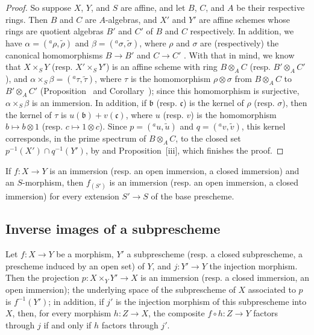 \begin{proof}
So suppose $X$, $Y$, and $S$ are affine, and let $B$, $C$, and $A$ be their respective rings.
Then $B$ and $C$ are $A$-algebras, and $X'$ and $Y'$ are affine schemes whose rings are quotient algebras $B'$ and $C'$ of $B$ and $C$ respectively.
In addition, we have $\alpha=({}^a\rho,\widetilde{\rho})$ and $\beta=({}^a\sigma,\widetilde{\sigma})$, where $\rho$ and $\sigma$ are (respectively) the canonical homomorphisms $B\to B'$ and $C\to C'$ .
With that in mind, we know that $X\times_S Y$ (resp. $X'\times_S Y'$) is an affine scheme with ring $B\otimes_A C$ (resp. $B'\otimes_A C'$), and $\alpha\times_S\beta=({}^a\tau,\widetilde{\tau})$, where $\tau$ is the homomorphism $\rho\otimes\sigma$ from $B\otimes_A C$ to $B'\otimes_A C'$ (Proposition~ and Corollary~);
since this homomorphism is surjective, $\alpha\times_S\beta$ is an immersion.
In addition, if $\mathfrak{b}$ (resp. $\mathfrak{c}$) is the kernel of $\rho$ (resp. $\sigma$), then the kernel of $\tau$ is $u(\mathfrak{b})+v(\mathfrak{c})$, where $u$ (resp. $v$) is the homomorphism $b\mapsto b\otimes 1$ (resp. $c\mapsto 1\otimes c$).
Since $p=({}^a u,\widetilde{u})$ and $q=({}^a v,\widetilde{v})$, this kernel corresponds, in the prime spectrum of $B\otimes_A C$, to the closed set $p^{-1}(X')\cap q^{-1}(Y')$, by  and Proposition~[iii], which finishes the proof.
\end{proof}

\begin{corollary}[4.3.2]
\label{I.4.3.2}
If $f:X\to Y$ is an immersion (resp. an open immersion, a closed immersion) and an $S$-morphism, then $f_{(S')}$ is an immersion (resp. an open immersion, a closed immersion) for every extension $S'\to S$ of the base prescheme.
\end{corollary}

\subsection{Inverse images of a subprescheme}
\label{subsection:I.4.4}

\begin{proposition}[4.4.1]
\label{I.4.4.1}
Let $f:X\to Y$ be a morphism, $Y'$ a subprescheme (resp. a closed subprescheme, a prescheme induced by an open set) of $Y$, and $j:Y'\to Y$ the injection morphism.
Then the projection $p:X\times_Y Y'\to X$ is an immersion (resp. a closed immersion, an open immersion);
the underlying space of the subprescheme of $X$ associated to $p$ is $f^{-1}(Y')$;
in addition, if $j'$ is the injection morphism of this subprescheme into $X$, then, for every morphism $h:Z\to X$, the composite $f\circ h:Z\to Y$ factors through $j$ if and only if $h$ factors through $j'$.
\end{proposition}

